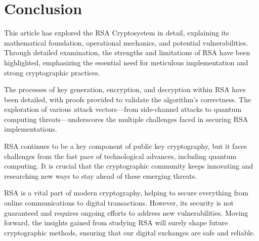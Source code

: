 \documentclass[11pt,a4paper]{article}
\numberwithin{equation}{section}
\begin{document}
\newpage 

\section{Conclusion}
\hspace{0.5cm}This article has explored the RSA Cryptosystem in detail, explaining its mathematical foundation, operational mechanics, and potential vulnerabilities. Through detailed examination, the strengths and limitations of RSA have been highlighted, emphasizing the essential need for meticulous implementation and strong cryptographic practices.

The processes of key generation, encryption, and decryption within RSA have been detailed, with proofs provided to validate the algorithm's correctness. The exploration of various attack vectors—from side-channel attacks to quantum computing threats—underscores the multiple challenges faced in securing RSA implementations. 

RSA continues to be a key component of public key cryptography, but it faces challenges from the fast pace of technological advances, including quantum computing. It is crucial that the cryptographic community keeps innovating and researching new ways to stay ahead of these emerging threats. 

RSA is a vital part of modern cryptography, helping to secure everything from online communications to digital transactions. However, its security is not guaranteed and requires ongoing efforts to address new vulnerabilities. Moving forward, the insights gained from studying RSA will surely shape future cryptographic methods, ensuring that our digital exchanges are safe and reliable.



\newpage
\end{document}
